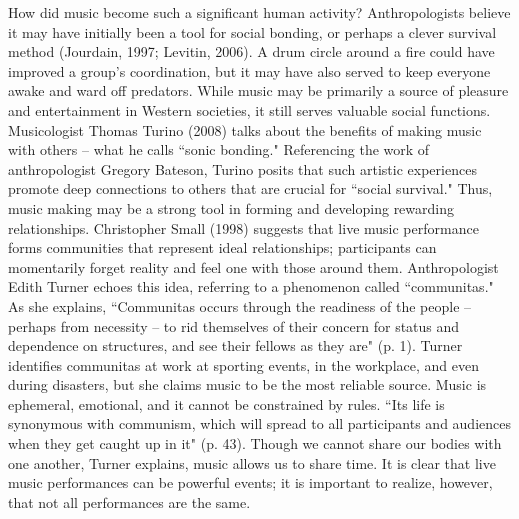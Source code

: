 How did music become such a significant human activity? Anthropologists believe it may have initially been a tool for social bonding, or perhaps a clever survival method (Jourdain, 1997; Levitin, 2006). A drum circle around a fire could have improved a group's coordination, but it may have also served to keep everyone awake and ward off predators. While music may be primarily a source of pleasure and entertainment in Western societies, it still serves valuable social functions. Musicologist Thomas Turino (2008) talks about the benefits of making music with others -- what he calls ``sonic bonding." Referencing the work of anthropologist Gregory Bateson, Turino posits that such artistic experiences promote deep connections to others that are crucial for ``social survival." Thus, music making may be a strong tool in forming and developing rewarding relationships. Christopher Small (1998) suggests that live music performance forms communities that represent ideal relationships; participants can momentarily forget reality and feel one with those around them. Anthropologist Edith Turner echoes this idea, referring to a phenomenon called ``communitas." As she explains, ``Communitas occurs through the readiness of the people -- perhaps from necessity -- to rid themselves of their concern for status and dependence on structures, and see their fellows as they are" (p. 1). Turner identifies communitas at work at sporting events, in the workplace, and even during disasters, but she claims music to be the most reliable source. Music is ephemeral, emotional, and it cannot be constrained by rules. ``Its life is synonymous with communism, which will spread to all participants and audiences when they get caught up in it" (p. 43). Though we cannot share our bodies with one another, Turner explains, music allows us to share time. It is clear that live music performances can be powerful events; it is important to realize, however, that not all performances are the same.

